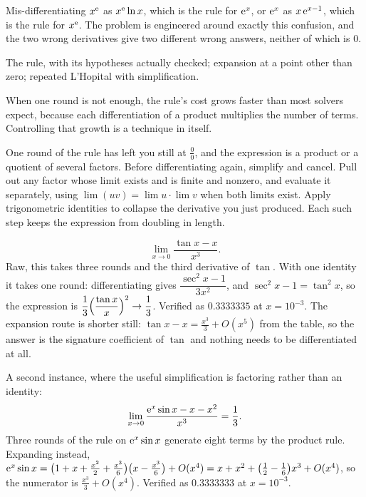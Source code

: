 \begin{trap}
Mis-differentiating $x^{\mathrm{e}}$ as $x^{\mathrm{e}}\ln x$, which is the rule for $\mathrm{e}^{x}$, or $\mathrm{e}^{x}$ as $x\,\mathrm{e}^{x-1}$, which is the rule for $x^{\mathrm{e}}$. The problem is engineered around exactly this confusion, and the two wrong derivatives give two different wrong answers, neither of which is $0$.
\end{trap}

\begin{seealsob}The rule, with its hypotheses actually checked; expansion at a point other than zero; repeated L'Hopital with simplification.\end{seealsob}

When one round is not enough, the rule's cost grows faster than most solvers expect, because each differentiation of a product multiplies the number of terms. Controlling that growth is a technique in itself.

\cue One round of the rule has left you still at $\tfrac00$, and the expression is a product or a quotient of several factors.
\method Before differentiating again, simplify and cancel. Pull out any factor whose limit exists and is finite and nonzero, and evaluate it separately, using $\lim(uv)=\lim u\cdot\lim v$ when both limits exist. Apply trigonometric identities to collapse the derivative you just produced. Each such step keeps the expression from doubling in length.

\begin{worked}
\[
\lim_{x\to0}\frac{\tan x-x}{x^{3}}.
\]
Raw, this takes three rounds and the third derivative of $\tan$. With one identity it takes one round: differentiating gives $\dfrac{\sec^{2}x-1}{3x^{2}}$, and $\sec^{2}x-1=\tan^{2}x$, so the expression is $\dfrac13\Bigl(\dfrac{\tan x}{x}\Bigr)^{2}\to\dfrac13$. Verified as $0.3333335$ at $x=10^{-3}$. The expansion route is shorter still: $\tan x-x=\tfrac{x^{3}}{3}+O(x^{5})$ from the table, so the answer is the signature coefficient of $\tan$ and nothing needs to be differentiated at all.

A second instance, where the useful simplification is factoring rather than an identity:
\[
\lim_{x\to0}\frac{\mathrm{e}^{x}\sin x-x-x^{2}}{x^{3}}=\frac13 .
\]
Three rounds of the rule on $\mathrm{e}^{x}\sin x$ generate eight terms by the product rule. Expanding instead, $\mathrm{e}^{x}\sin x=\bigl(1+x+\tfrac{x^{2}}{2}+\tfrac{x^{3}}{6}\bigr)\bigl(x-\tfrac{x^{3}}{6}\bigr)+O(x^{4})=x+x^{2}+\bigl(\tfrac12-\tfrac16\bigr)x^{3}+O(x^{4})$, so the numerator is $\tfrac{x^{3}}{3}+O(x^{4})$. Verified as $0.3333333$ at $x=10^{-3}$.
\end{worked}

